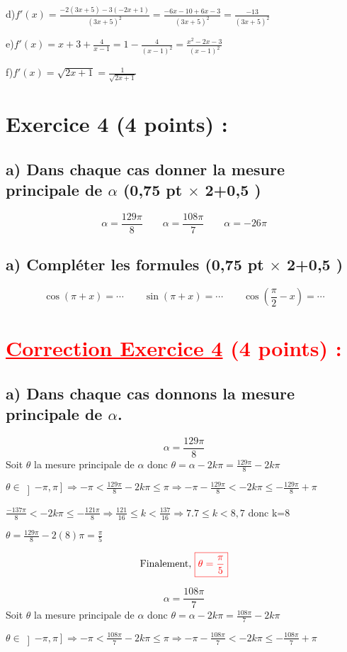 \documentclass[12pt]{article}
\begin{document}
d)$f'(x)=\frac{-2(3x+5)-3(-2x+1)}{(3x+5)^{2}}=\frac{-6x-10+6x-3}{(3x+5)^{2}}=\frac{-13}{(3x+5)^{2}}$

e)$f'(x)=x+3+\frac{4}{x-1}=1-\frac{4}{(x-1)^{2}}=\frac{x^{2}-2x-3}{(x-1)^{2}}$

f)$f'(x)=\sqrt{2x+1}=\frac{1}{\sqrt{2x+1}}$
\section*{Exercice 4 (4 points) :}
\subsection*{a) Dans chaque cas donner la mesure principale de $\alpha$ (0,75 pt $\times$ 2+0,5 )}
\[\alpha =\frac{129\pi}{8}\quad\quad \alpha =\frac{108\pi}{7}\quad\quad \alpha = -26\pi \]
\subsection*{a) Compléter les formules (0,75 pt $\times$ 2+0,5 )}
\[\cos(\pi+x)=\cdots\quad\quad \sin(\pi+x)=\cdots\quad\quad \cos(\frac{\pi}{2}-x)=\cdots\]
\section*{\textcolor{red}{\underline{Correction Exercice 4} (4 points) :}}
\subsection*{a) Dans chaque cas donnons la mesure principale de $\alpha$.}
\[\alpha =\frac{129\pi}{8} \]
Soit $\theta$ la mesure principale de $\alpha$ donc $\theta=\alpha-2k\pi=\frac{129\pi}{8}-2k\pi$ 

$\theta \in \left]-\pi, \pi\right]\Rightarrow -\pi<\frac{129\pi}{8}-2k\pi\leq \pi \Rightarrow -\pi-\frac{129\pi}{8}<-2k\pi\leq-\frac{129\pi}{8}+\pi$ 

$\frac{-137\pi}{8}<-2k\pi\leq-\frac{121\pi}{8} \Rightarrow \frac{121}{16}\leq k <\frac{137}{16} \Rightarrow 7.7\leq k <8,7  $ donc k=8

$\theta=\frac{129\pi}{8}-2(8)\pi=\frac{\pi}{5}$ 

\[\text{Finalement, }\textcolor{red}{\boxed{\theta=\frac{\pi}{5}}}\] 

\[\alpha =\frac{108\pi}{7} \]
Soit $\theta$ la mesure principale de $\alpha$ donc $\theta=\alpha-2k\pi=\frac{108\pi}{7}-2k\pi$ 

$\theta \in \left]-\pi, \pi\right]\Rightarrow -\pi<\frac{108\pi}{7}-2k\pi\leq \pi \Rightarrow -\pi-\frac{108\pi}{7}<-2k\pi\leq-\frac{108\pi}{7}+\pi$ 
\end{document}
